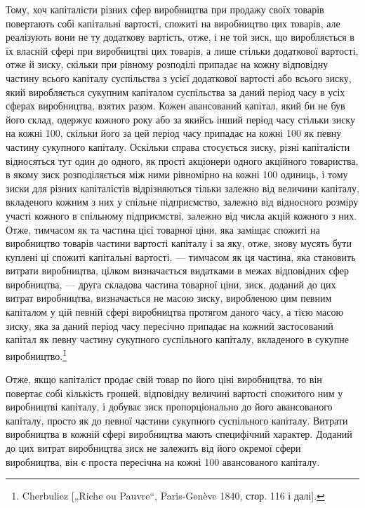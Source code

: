 Тому, хоч капіталісти різних сфер виробництва при продажу
своїх товарів повертають собі капітальні вартості, спожиті на
виробництво цих товарів, але реалізують вони не ту додаткову
вартість, отже, і не той зиск, що виробляється в їх власній
сфері при виробництві цих товарів, а лише стільки додаткової вартості, отже й зиску, скільки при
рівному розподілі
припадає на кожну відповідну частину всього капіталу суспільства з усієї додаткової вартості або
всього зиску, який виробляється сукупним капіталом суспільства за даний період часу
в усіх сферах виробництва, взятих разом. Кожен авансований
капітал, який би не був його склад, одержує кожного року або
за якийсь інший період часу стільки зиску на кожні 100, скільки
його за цей період часу припадає на кожні 100 як певну частину
сукупного капіталу. Оскільки справа стосується зиску, різні капіталісти відносяться тут один до
одного, як прості акціонери
одного акційного товариства, в якому зиск розподіляється між
ними рівномірно на кожні 100 одиниць, і тому зиски для різних
капіталістів відрізняються тільки залежно від величини капіталу,
вкладеного кожним з них у спільне підприємство, залежно від
відносного розміру участі кожного в спільному підприємстві,
залежно від числа акцій кожного з них. Отже, тимчасом як та
частина цієї товарної ціни, яка заміщає спожиті на виробництво
товарів частини вартості капіталу і за яку, отже, знову мусять
бути куплені ці спожиті капітальні вартості, — тимчасом як ця
частина, яка становить витрати виробництва, цілком визначається
видатками в межах відповідних сфер виробництва, — друга складова частина товарної ціни, зиск,
доданий до цих витрат виробництва, визначається не масою зиску, виробленою цим певним
капіталом у цій певній сфері виробництва протягом даного
часу, а тією масою зиску, яка за даний період часу пересічно припадає на кожний застосований капітал
як певну частину
сукупного суспільного капіталу, вкладеного в сукупне
виробництво.\footnote{
Cherbuliez [„Riche ou Pauvre“, Paris-Genève 1840, стор. 116 і далі].
}

Отже, якщо капіталіст продає свій товар по його ціні виробництва, то він повертає собі кількість
грошей, відповідну величині вартості спожитого ним у виробництві капіталу, і добуває зиск
пропорціонально до його авансованого капіталу, просто
як до певної частини сукупного суспільного капіталу. Витрати
виробництва в кожній сфері виробництва мають специфічний
характер. Доданий до цих витрат виробництва зиск не залежить від його окремої сфери виробництва, він
є проста пересічна
на кожні 100 авансованого капіталу.

